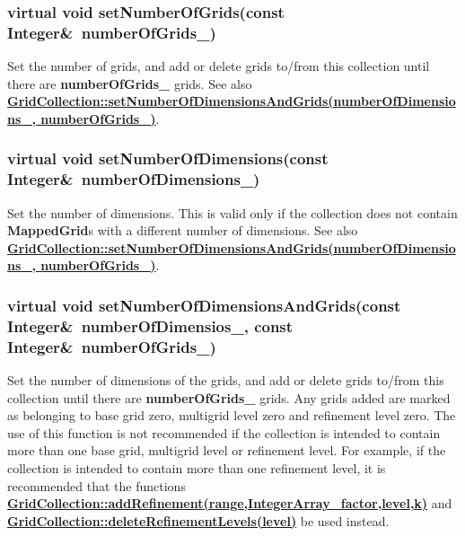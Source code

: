 \documentclass{article}
\begin{document}
  \subsubsection{virtual void setNumberOfGrids(const Integer\&~numberOfGrids\_)}
  \label{GridCollection::setNumberOfGrids(numberOfGrids_)}
    Set the number of grids, and add or delete grids to/from this collection until there are \textbf{numberOfGrids\_} grids.
    See also {\bf{}\hyperref{setNumberOfDimensionsAndGrids(numberOfDimensions\_, numberOfGrids\_)}{setNumberOfDimensionsAndGrids(numberOfDimensions\_, numberOfGrids\_) \rm(\S}{)}{GridCollection::setNumberOfDimensionsAndGrids(numberOfDimensions_, numberOfGrids_)}}.

  \subsubsection{virtual void setNumberOfDimensions(const Integer\&~numberOfDimensions\_)}
  \label{GridCollection::setNumberOfDimensions(numberOfDimensions)}
    Set the number of dimensions.  This is valid only if the collection does not contain \textbf{MappedGrid}s with a different number of dimensions.
    See also {\bf{}\hyperref{setNumberOfDimensionsAndGrids(numberOfDimensions\_, numberOfGrids\_)}{setNumberOfDimensionsAndGrids(numberOfDimensions\_, numberOfGrids\_) \rm(\S}{)}{GridCollection::setNumberOfDimensionsAndGrids(numberOfDimensions_, numberOfGrids_)}}.

  \subsubsection{virtual void setNumberOfDimensionsAndGrids(const Integer\&~numberOfDimensios\_, const Integer\&~numberOfGrids\_)}
  \label{GridCollection::setNumberOfDimensionsAndGrids(numberOfDimensions_, numberOfGrids_)}
    Set the number of dimensions of the grids, and add or delete grids to/from this collection until there are \textbf{numberOfGrids\_} grids.
    Any grids added are marked as belonging to base grid zero, multigrid level zero and refinement level zero.
    The use of this function is not recommended if the collection is intended to contain more than one
    base grid, multigrid level or refinement level.  For example,
    if the collection is intended to contain more than one refinement level, it is recommended that the functions
    {\bf{}\hyperref{addRefinement(range,factor,level,k)}{addRefinement(range,factor,level,k) \rm(\S}{)}{GridCollection::addRefinement(range,IntegerArray_factor,level,k)}} and
    {\bf{}\hyperref{deleteRefinementLevels(level)}{deleteRefinementLevels(level) \rm(\S}{)}{GridCollection::deleteRefinementLevels(level)}}
    be used instead.
\end{document}
